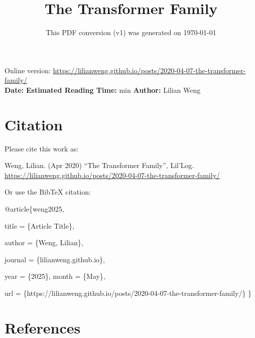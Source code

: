 \documentclass[12pt]{article}
\title{The Transformer Family}
\date{This PDF conversion (v1) was generated on \today\footnotemark}
\begin{document}
\maketitle
\begin{center}
    Online version: \url{https://lilianweng.github.io/posts/2020-04-07-the-transformer-family/} \\
    \textbf{Date:} \quad
    \textbf{Estimated Reading Time:}  min \quad
    \textbf{Author:} Lilian Weng
\end{center}




\newpage
\tableofcontents
\newpage
\vspace{1em}
\n\n\n\section{Citation}
Please cite this work as:

\begin{tcolorbox}[colback=black!5!white, colframe=black!80!white, boxrule=0.5pt, arc=2mm, left=1mm, right=1mm, top=1mm, bottom=1mm]
  Weng, Lilian. (Apr 2020) ``The Transformer Family'', Lil'Log. \url{https://lilianweng.github.io/posts/2020-04-07-the-transformer-family/}
  \end{tcolorbox}

Or use the BibTeX citation:

\begin{tcolorbox}[
    colback=black!5!white,
    colframe=black!80!white,
    boxrule=0.5pt,
    arc=2mm,
    left=1mm,
    right=1mm,
    top=1mm,
    bottom=1mm,
    listing only,
    listing options={
      basicstyle=\ttfamily\footnotesize,
      breaklines=true,
      literate={\{}{{\char`\{}}1 {\}}{{\char`\}}}1
    }
  ]
  @article\{weng2025,

    title   = \{Article Title\},

    author  = \{Weng, Lilian\},

    journal = \{lilianweng.github.io\},

    year    = \{2025\},
    month   = \{May\},

    url     = \{https://lilianweng.github.io/posts/2020-04-07-the-transformer-family/\}\n
  \}
  \end{tcolorbox}

\newpage
\section{References}

\n
\end{document}
